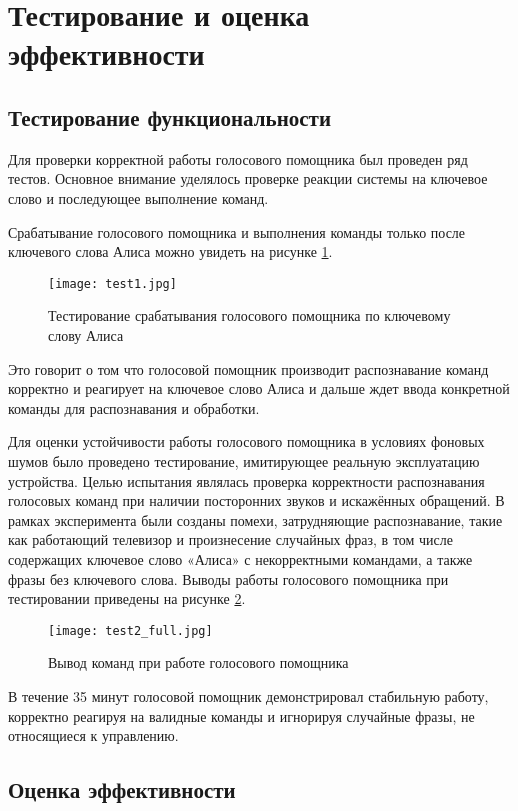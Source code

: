 \section{Тестирование и оценка эффективности}

\subsection{Тестирование функциональности}
Для проверки корректной работы голосового помощника был проведен ряд тестов. Основное внимание уделялось проверке реакции системы на ключевое слово и последующее выполнение команд. 

Срабатывание голосового помощника и выполнения команды только после ключевого слова Алиса можно увидеть на рисунке \ref{fig:test1}.

\begin{figure}[H]
	\centering
	\texttt{[image: test1.jpg]}
	\caption{Тестирование срабатывания голосового помощника по ключевому слову Алиса}
	\label{fig:test1}
\end{figure}
Это говорит о том что голосовой помощник производит распознавание команд корректно и реагирует на ключевое слово Алиса и дальше ждет ввода конкретной команды для распознавания и обработки.


Для оценки устойчивости работы голосового помощника в условиях фоновых шумов было проведено тестирование, имитирующее реальную эксплуатацию устройства. Целью испытания являлась проверка корректности распознавания голосовых команд при наличии посторонних звуков и искажённых обращений. В рамках эксперимента были созданы помехи, затрудняющие распознавание, такие как работающий телевизор и произнесение случайных фраз, в том числе содержащих ключевое слово «Алиса» с некорректными командами, а также фразы без ключевого слова. Выводы работы голосового помощника при тестировании приведены на рисунке \ref{fig:test2}.

\begin{figure}[H]
	\centering
	\texttt{[image: test2\_full.jpg]}
	\caption{Вывод команд при работе голосового помощника}
	\label{fig:test2}
\end{figure}
В течение 35 минут голосовой помощник демонстрировал стабильную работу, корректно реагируя на валидные команды и игнорируя случайные фразы, не относящиеся к управлению.

\subsection{Оценка эффективности}

